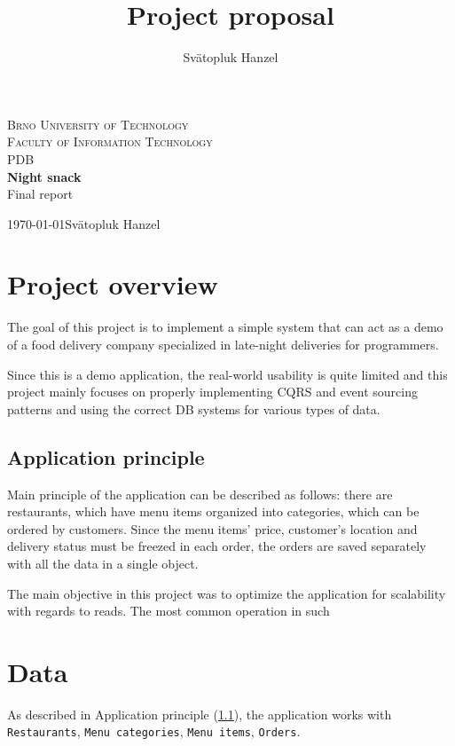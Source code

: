 \documentclass[11pt,a4paper]{article}
\author{Svätopluk Hanzel}
\title{Project proposal}
\begin{document}
\begin{titlepage}
	\begin{center}
		{\LARGE\textsc{Brno University of Technology}}\\
		\smallskip
		{\Large\textsc{Faculty of Information Technology}}\\
		\bigskip
		\smallskip
		\huge{PDB}\\
		\huge{\textbf{Night snack}}\\
		\Large{Final report}
	\end{center}
	{\today \hfill Svätopluk Hanzel}
\end{titlepage}

\section{Project overview}
	The goal of this project is to implement a simple system that can act as a demo of a food delivery company specialized in late-night deliveries for programmers.
	
	Since this is a demo application, the real-world usability is quite limited and this project mainly focuses on properly implementing CQRS and event sourcing patterns and using the correct DB systems for various types of data.
	
	\subsection{Application principle}\label{sec:app-principle}
		Main principle of the application can be described as follows: there are restaurants, which have menu items organized into categories, which can be ordered by customers. Since the menu items' price, customer's location and delivery status must be freezed in each order, the orders are saved separately with all the data in a single object.
		
		The main objective in this project was to optimize the application for scalability with regards to reads. The most common operation in such 

\section{Data}\label{sec:data}
	As described in Application principle (\ref{sec:app-principle}), the application works with \texttt{Restaurants}, \texttt{Menu categories}, \texttt{Menu items}, \texttt{Orders}.
	
\end{document}
